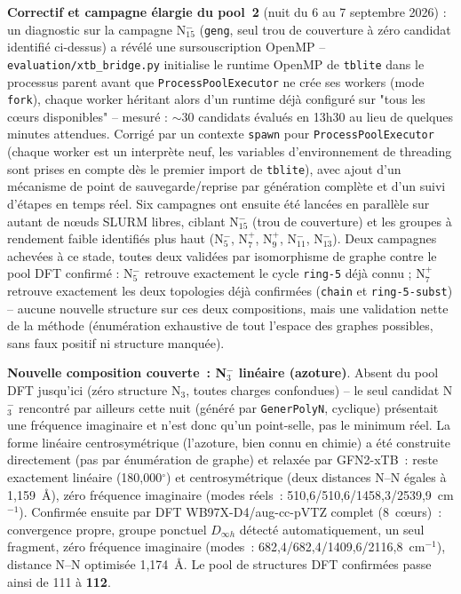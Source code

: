 \documentclass[11pt,a4paper]{article}
\begin{document}
\textbf{Correctif et campagne \'elargie du pool~2} (nuit du 6 au 7
septembre 2026) : un diagnostic sur la campagne N$_{15}^-$ (\texttt{geng},
seul trou de couverture \`a z\'ero candidat identifi\'e ci-dessus) a
r\'ev\'el\'e une sursouscription OpenMP -- \texttt{evaluation/xtb\_bridge.py}
initialise le runtime OpenMP de \texttt{tblite} dans le processus parent
avant que \texttt{ProcessPoolExecutor} ne cr\'ee ses workers (mode
\texttt{fork}), chaque worker h\'eritant alors d'un runtime d\'ej\`a
configur\'e sur "tous les c\oe urs disponibles" -- mesur\'e : $\sim$30
candidats \'evalu\'es en 13h30 au lieu de quelques minutes attendues.
Corrig\'e par un contexte \texttt{spawn} pour \texttt{ProcessPoolExecutor}
(chaque worker est un interpr\`ete neuf, les variables d'environnement de
threading sont prises en compte d\`es le premier import de \texttt{tblite}),
avec ajout d'un m\'ecanisme de point de sauvegarde/reprise par
g\'en\'eration compl\`ete et d'un suivi d'\'etapes en temps r\'eel. Six
campagnes ont ensuite \'et\'e lanc\'ees en parall\`ele sur autant de
n\oe uds SLURM libres, ciblant N$_{15}^-$ (trou de couverture) et les
groupes \`a rendement faible identifi\'es plus haut (N$_5^-$, N$_7^+$,
N$_9^+$, N$_{11}^-$, N$_{13}^-$). Deux campagnes achev\'ees \`a ce stade,
toutes deux valid\'ees par isomorphisme de graphe contre le pool DFT
confirm\'e : N$_5^-$ retrouve exactement le cycle \texttt{ring-5} d\'ej\`a
connu ; N$_7^+$ retrouve exactement les deux topologies d\'ej\`a
confirm\'ees (\texttt{chain} et \texttt{ring-5-subst}) -- aucune nouvelle
structure sur ces deux compositions, mais une validation nette de la
m\'ethode (\'enum\'eration exhaustive de tout l'espace des graphes
possibles, sans faux positif ni structure manqu\'ee).

\textbf{Nouvelle composition couverte~: N$_3^-$ lin\'eaire (azoture)}.
Absent du pool DFT jusqu'ici (z\'ero structure N$_3$, toutes charges
confondues) -- le seul candidat N$_3^-$ rencontr\'e par ailleurs cette
nuit (g\'en\'er\'e par \texttt{GenerPolyN}, cyclique) pr\'esentait une
fr\'equence imaginaire et n'est donc qu'un point-selle, pas le minimum
r\'eel. La forme lin\'eaire centrosym\'etrique (l'azoture, bien connu en
chimie) a \'et\'e construite directement (pas par \'enum\'eration de
graphe) et relax\'ee par GFN2-xTB~: reste exactement lin\'eaire
(180,000$^\circ$) et centrosym\'etrique (deux distances N--N \'egales \`a
1,159~\AA), z\'ero fr\'equence imaginaire (modes r\'eels~:
510,6/510,6/1458,3/2539,9~cm$^{-1}$). Confirm\'ee ensuite par DFT
WB97X-D4/aug-cc-pVTZ complet (8~c\oe urs)~: convergence propre, groupe
ponctuel $D_{\infty h}$ d\'etect\'e automatiquement, un seul fragment,
z\'ero fr\'equence imaginaire (modes~:
682,4/682,4/1409,6/2116,8~cm$^{-1}$), distance N--N optimis\'ee
1,174~\AA. Le pool de structures DFT confirm\'ees passe ainsi de 111
\`a \textbf{112}.
\end{document}
